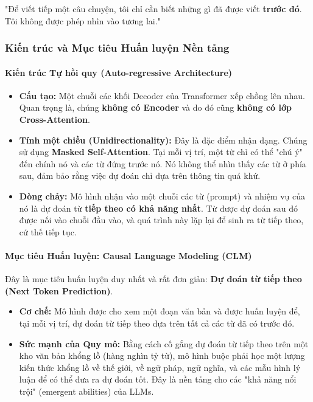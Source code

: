 \begin{tcolorbox}[
    title=Triết lý của Decoder-Only,
    colback=red!5!white, colframe=red!75!black, fonttitle=\bfseries
]
"Để viết tiếp một câu chuyện, tôi chỉ cần biết những gì đã được viết \textbf{trước đó}. Tôi không được phép nhìn vào tương lai."
\end{tcolorbox}

\subsubsection{Kiến trúc và Mục tiêu Huấn luyện Nền tảng}
\paragraph{Kiến trúc Tự hồi quy (Auto-regressive Architecture)}
\begin{itemize}
    \item \textbf{Cấu tạo:} Một chuỗi các khối Decoder của Transformer xếp chồng lên nhau. Quan trọng là, chúng \textbf{không có Encoder} và do đó cũng \textbf{không có lớp Cross-Attention}.
    \item \textbf{Tính một chiều (Unidirectionality):} Đây là đặc điểm nhận dạng. Chúng sử dụng \textbf{Masked Self-Attention}. Tại mỗi vị trí, một từ chỉ có thể "chú ý" đến chính nó và các từ đứng trước nó. Nó không thể nhìn thấy các từ ở phía sau, đảm bảo rằng việc dự đoán chỉ dựa trên thông tin quá khứ.
    \item \textbf{Dòng chảy:} Mô hình nhận vào một chuỗi các từ (prompt) và nhiệm vụ của nó là dự đoán từ \textbf{tiếp theo có khả năng nhất}. Từ được dự đoán sau đó được nối vào chuỗi đầu vào, và quá trình này lặp lại để sinh ra từ tiếp theo, cứ thế tiếp tục.
\end{itemize}

\paragraph{Mục tiêu Huấn luyện: Causal Language Modeling (CLM)}
Đây là mục tiêu huấn luyện duy nhất và rất đơn giản: \textbf{Dự đoán từ tiếp theo (Next Token Prediction)}.
\begin{itemize}
    \item \textbf{Cơ chế:} Mô hình được cho xem một đoạn văn bản và được huấn luyện để, tại mỗi vị trí, dự đoán từ tiếp theo dựa trên tất cả các từ đã có trước đó.
    \item \textbf{Sức mạnh của Quy mô:} Bằng cách cố gắng dự đoán từ tiếp theo trên một kho văn bản khổng lồ (hàng nghìn tỷ từ), mô hình buộc phải học một lượng kiến thức khổng lồ về thế giới, về ngữ pháp, ngữ nghĩa, và các mẫu hình lý luận để có thể đưa ra dự đoán tốt. Đây là nền tảng cho các "khả năng nổi trội" (emergent abilities) của LLMs.
\end{itemize}

